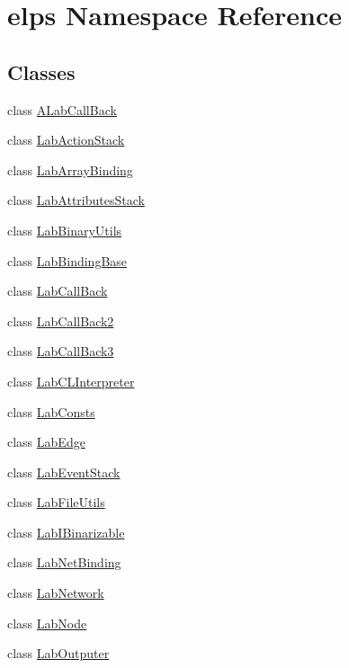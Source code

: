 \hypertarget{namespaceelps}{\section{elps Namespace Reference}
\label{namespaceelps}
}
\subsection*{Classes}
\begin{DoxyCompactItemize}
\item 
class \hyperlink{classelps_1_1_a_lab_call_back}{A\+Lab\+Call\+Back}
\item 
class \hyperlink{classelps_1_1_lab_action_stack}{Lab\+Action\+Stack}
\item 
class \hyperlink{classelps_1_1_lab_array_binding}{Lab\+Array\+Binding}
\item 
class \hyperlink{classelps_1_1_lab_attributes_stack}{Lab\+Attributes\+Stack}
\item 
class \hyperlink{classelps_1_1_lab_binary_utils}{Lab\+Binary\+Utils}
\item 
class \hyperlink{classelps_1_1_lab_binding_base}{Lab\+Binding\+Base}
\item 
class \hyperlink{classelps_1_1_lab_call_back}{Lab\+Call\+Back}
\item 
class \hyperlink{classelps_1_1_lab_call_back2}{Lab\+Call\+Back2}
\item 
class \hyperlink{classelps_1_1_lab_call_back3}{Lab\+Call\+Back3}
\item 
class \hyperlink{classelps_1_1_lab_c_l_interpreter}{Lab\+C\+L\+Interpreter}
\item 
class \hyperlink{classelps_1_1_lab_consts}{Lab\+Consts}
\item 
class \hyperlink{classelps_1_1_lab_edge}{Lab\+Edge}
\item 
class \hyperlink{classelps_1_1_lab_event_stack}{Lab\+Event\+Stack}
\item 
class \hyperlink{classelps_1_1_lab_file_utils}{Lab\+File\+Utils}
\item 
class \hyperlink{classelps_1_1_lab_i_binarizable}{Lab\+I\+Binarizable}
\item 
class \hyperlink{classelps_1_1_lab_net_binding}{Lab\+Net\+Binding}
\item 
class \hyperlink{classelps_1_1_lab_network}{Lab\+Network}
\item 
class \hyperlink{classelps_1_1_lab_node}{Lab\+Node}
\item 
class \hyperlink{classelps_1_1_lab_outputer}{Lab\+Outputer}

\end{DoxyCompactItemize}
